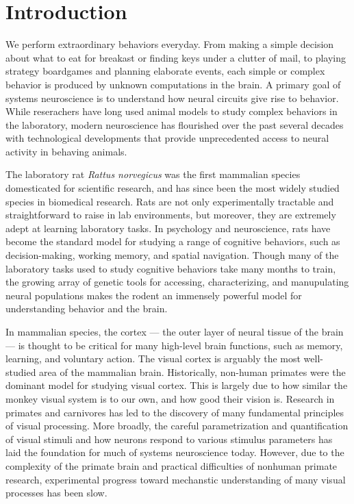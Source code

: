 \chapter{Introduction}
\label{introduction}

We perform extraordinary behaviors everyday. From making a simple decision about what to eat for breakast or finding keys under a clutter of mail, to playing strategy boardgames and planning elaborate events, each simple or complex behavior is produced by unknown computations in the brain. A primary goal of systems neuroscience is to understand how neural circuits give rise to behavior. While reserachers have long used animal models to study complex behaviors in the laboratory, modern neuroscience has flourished over the past several decades with technological developments that provide unprecedented access to neural activity in behaving animals. 

The laboratory rat \textit{Rattus norvegicus} was the first mammalian species domesticated for scientific research\cite{Jacob1999}, and has since been the most widely studied species in biomedical research. Rats are not only experimentally tractable and straightforward to raise in lab environments, but moreover, they are extremely adept at learning laboratory tasks. In psychology and neuroscience, rats have become the standard model for studying a range of cognitive behaviors, such as decision-making\cite{Raposo2012, Miller2017TwoStep, Piet2018, Brunton2013}, working memory\cite{Bratch2016, Fassihi2014, Akrami2018}, and spatial navigation\cite{OKeefe1971, Whishaw1995, Aronov2014, Poo2020}. Though many of the laboratory tasks used to study cognitive behaviors take many months to train, the growing array of genetic tools for accessing, characterizing, and manupulating neural populations makes the rodent an immensely powerful model for understanding behavior and the brain. 

In mammalian species, the cortex --- the outer layer of neural tissue of the brain --- is thought to be critical for many high-level brain functions, such as memory, learning, and voluntary action. The visual cortex is arguably the most well-studied area of the mammalian brain. Historically, non-human primates were the dominant model for studying visual cortex. This is largely due to how similar the monkey visual system is to our own, and how good their vision is. Research in primates and carnivores has led to the discovery of many fundamental principles of visual processing\cite{Hubel1962, Hubel1968, Reid1991}. More broadly, the careful parametrization and quantification of visual stimuli and how neurons respond to various stimulus parameters has laid the foundation for much of systems neuroscience today. However, due to the complexity of the primate brain and practical difficulties of nonhuman primate research, experimental progress toward mechanstic understanding of many visual processes has been slow.  

